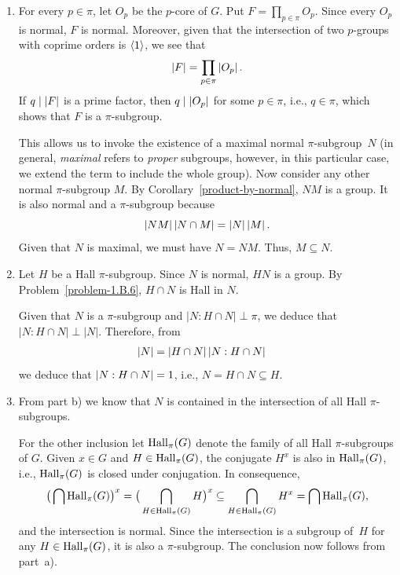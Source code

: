 \begin{solution}
\begin{enumerate}[\upshape a)]
    \item For every\/ $p\in\pi$, let $O_p$ be the $p$-core of $G$. Put $F=\prod_{p\in\pi}O_p$. Since every $O_p$ is normal, $F$ is normal. Moreover, given that the intersection of two $p$-groups with coprime orders is $\langle1\rangle$, we see that
    $$
        \left\vert{F}\right\vert= \prod_{p\in\pi}\left\vert{O_p}\right\vert.
    $$
    If $q\mid\left\vert{F}\right\vert$ is a prime factor, then $q\mid\left\vert{O_p}\right\vert$ for some $p\in\pi$, i.e., $q\in\pi$, which shows that $F$ is a $\pi$-subgroup. 

    
    This allows us to invoke the existence of a maximal normal $\pi$-subgroup~$N$ (in general, \textit{maximal\/} refers to \textit{proper\/} subgroups, however, in this particular case, we extend the term to include the whole group). Now consider any other normal $\pi$-subgroup $M$. By Corollary~\ref{product-by-normal}, $NM$ is a group. It is also normal and a $\pi$-subgroup because
    $$
        \left\vert{NM}\right\vert\left\vert{N\cap M}\right\vert = \left\vert{N}\right\vert\left\vert{M}\right\vert.
    $$
    Given that $N$ is maximal, we must have $N=NM$. Thus, $M\subseteq N$.

    \item Let $H$ be a Hall $\pi$-subgroup. Since $N$ is normal, $HN$ is a group. By Problem~\ref{problem-1.B.6}, $H\cap N$ is Hall in $N$.

    Given that $N$ is a $\pi$-subgroup and $|N:H\cap N|\perp\pi$, we deduce that $|N:H\cap N|\perp|N|$. Therefore, from
    \begin{align*}
        \left\vert{N}\right\vert&=\left\vert{H\cap N}\right\vert\left\vert{N:H\cap N}\right\vert
    \end{align*}
    we deduce that $\left\vert{N:H\cap N}\right\vert=1$, i.e., $N=H\cap N\subseteq H$.
    
    \item From part b) we know that $N$ is contained in the intersection of all Hall $\pi$-subgroups.

    For the other inclusion let ${\rm Hall}_\pi(G)$ denote the family of all Hall $\pi$-subgroups of $G$. Given $x\in G$ and $H\in{\rm Hall}_\pi(G)$, the conjugate $H^x$ is also in ${\rm Hall}_\pi(G)$, i.e., ${\rm Hall}_\pi(G)$ is closed under conjugation. In consequence,
    $$
        \big(\bigcap{{\rm Hall}_\pi(G)}\big)^x
            =\big(\bigcap_{H\in{\rm Hall}_\pi(G)}H\big)^x
            \subseteq \bigcap_{H\in{\rm Hall}_\pi(G)}H^x 
            = \bigcap{{\rm Hall}_\pi(G)},
    $$
    and the intersection is normal. Since the intersection is a subgroup of~$H$ for any $H\in{{\rm Hall}_\pi(G)}$, it is also a $\pi$-subgroup. The conclusion now follows from part~a).
\end{enumerate}
\end{solution}

